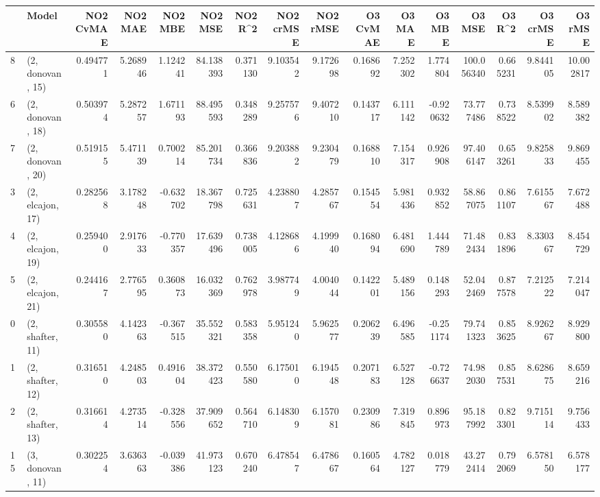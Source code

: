 \begin{tabular}{llrrrrrrrrrrrrrr}
\toprule
{} &             Model &  NO2 CvMAE &   NO2 MAE &   NO2 MBE &    NO2 MSE &   NO2 R\textasciicircum2 &  NO2 crMSE &  NO2 rMSE &  O3 CvMAE &    O3 MAE &    O3 MBE &      O3 MSE &    O3 R\textasciicircum2 &   O3 crMSE &    O3 rMSE \\
\midrule
8  &  (2, donovan, 15) &   0.494771 &  5.268946 &  1.124241 &  84.138393 &  0.371130 &   9.103542 &  9.172698 &  0.168692 &  7.252302 &  1.774804 &  100.056340 &  0.665231 &   9.844105 &  10.002817 \\
6  &  (2, donovan, 18) &   0.503974 &  5.287257 &  1.671193 &  88.495593 &  0.348289 &   9.257576 &  9.407210 &  0.143717 &  6.111142 & -0.920632 &   73.777486 &  0.738522 &   8.539902 &   8.589382 \\
7  &  (2, donovan, 20) &   0.519155 &  5.471139 &  0.700214 &  85.201734 &  0.366836 &   9.203882 &  9.230479 &  0.168810 &  7.154317 &  0.926908 &   97.406147 &  0.653261 &   9.825833 &   9.869455 \\
3  &  (2, elcajon, 17) &   0.282568 &  3.178248 & -0.632702 &  18.367798 &  0.725631 &   4.238807 &  4.285767 &  0.154554 &  5.981436 &  0.932852 &   58.867075 &  0.861107 &   7.615567 &   7.672488 \\
4  &  (2, elcajon, 19) &   0.259400 &  2.917633 & -0.770357 &  17.639496 &  0.738005 &   4.128686 &  4.199940 &  0.168094 &  6.481690 &  1.444789 &   71.482434 &  0.831896 &   8.330367 &   8.454729 \\
5  &  (2, elcajon, 21) &   0.244167 &  2.776595 &  0.360873 &  16.032369 &  0.762978 &   3.987749 &  4.004044 &  0.142201 &  5.489156 &  0.148293 &   52.042469 &  0.877578 &   7.212522 &   7.214047 \\
0  &  (2, shafter, 11) &   0.305580 &  4.142363 & -0.367515 &  35.552321 &  0.583358 &   5.951240 &  5.962577 &  0.206239 &  6.496585 & -0.251174 &   79.741323 &  0.853625 &   8.926267 &   8.929800 \\
1  &  (2, shafter, 12) &   0.316510 &  4.248503 &  0.491604 &  38.372423 &  0.550580 &   6.175010 &  6.194548 &  0.207183 &  6.527128 & -0.726637 &   74.982030 &  0.857531 &   8.628675 &   8.659216 \\
2  &  (2, shafter, 13) &   0.316614 &  4.273514 & -0.328556 &  37.909652 &  0.564710 &   6.148309 &  6.157081 &  0.230986 &  7.319845 &  0.896973 &   95.187992 &  0.823301 &   9.715114 &   9.756433 \\
15 &  (3, donovan, 11) &   0.302254 &  3.636363 & -0.039386 &  41.973123 &  0.670240 &   6.478547 &  6.478667 &  0.160564 &  4.782127 &  0.018779 &   43.272414 &  0.792069 &   6.578150 &   6.578177 \\

\end{tabular}

